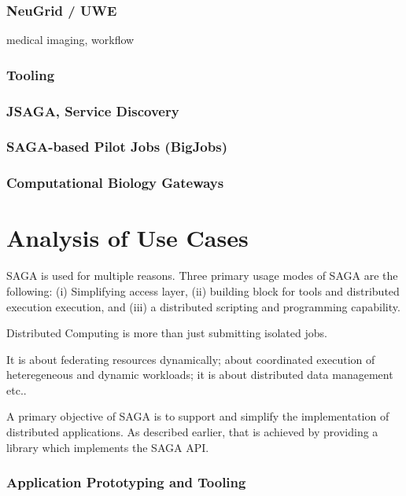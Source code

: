 \documentclass[12pt]{article}
\begin{document}
\subsubsection*{NeuGrid / UWE} medical imaging, workflow

\subsubsection{Tooling}
   \subsubsection*{JSAGA, Service Discovery}
   \subsubsection*{SAGA-based Pilot Jobs (BigJobs)}
   \subsubsection*{Computational Biology Gateways}

\section{Analysis of Use Cases}

SAGA is used for multiple reasons. Three primary usage modes of SAGA
are the following: (i) Simplifying access layer, (ii) building block
for tools and distributed execution execution, and (iii) a distributed
scripting and programming capability.

Distributed Computing is more than just submitting isolated jobs.

It is about federating resources dynamically; about coordinated
execution of heteregeneous and dynamic workloads; it is about
distributed data management etc..

A primary objective of SAGA is to support and simplify the
implementation of distributed applications.  As described earlier,
that is achieved by providing a library which implements the SAGA API.

\subsubsection*{Application Prototyping and Tooling}
\end{document}
